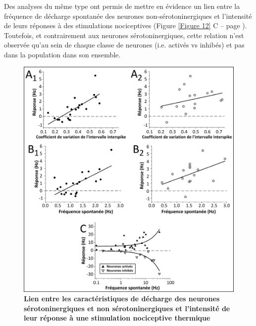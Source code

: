\documentclass[a4paper,12pt,twoside]{report}
\begin{document}
Des analyses du même type ont permis de mettre en évidence un lien entre la fréquence de décharge spontanée des neurones non-sérotoninergiques et l’intensité de leurs réponses à des stimulations nociceptives (Figure \ref{Figure 12} C – page \pageref{Figure 12}). Toutefois, et contrairement aux neurones sérotoninergiques, cette relation n’est observée qu’au sein de chaque classe de neurones (i.e. activés vs inhibés) et pas dans la population dans son ensemble.

\begin{figure}[p]

\begin{center}
 \includegraphics[width=14.5cm]{Figure12.jpg} 
\end{center}

\caption[Caractéristiques de décharge et intensité de réponse des neurones 5-HT et non-5-HT]{\textbf{Lien entre les caractéristiques de décharge des neurones sérotoninergiques et non sérotoninergiques et l’intensité de leur réponse à une stimulation nociceptive thermique}}


\end{figure}
\end{document}
